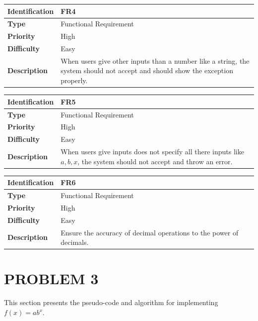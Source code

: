 \documentclass[11pt]{article}
\begin{document}
\begin{center}
    \begin{tabular}{|p{3cm}|p{11cm}| }
    \hline
    \textbf{Identification} &  FR4 \\ \hline 
    \textbf{Type} & Functional Requirement\\ \hline 
    \textbf{Priority} & High  \\ \hline
    \textbf{Difficulty} & Easy  \\ \hline
    \textbf{Description} & When users give other inputs than a number like a string, the system should not accept and should show the exception properly.\\ \hline
\end{tabular}
\end{center}

\begin{center}
    \begin{tabular}{|p{3cm}|p{11cm}| }
    \hline
    \textbf{Identification} &  FR5 \\ \hline 
    \textbf{Type} & Functional Requirement\\ \hline 
    \textbf{Priority} & High  \\ \hline
    \textbf{Difficulty} & Easy  \\ \hline
    \textbf{Description} & When users give inputs does not specify all there inputs like $a, b, x$, the system should not accept and throw an error.\\ \hline
\end{tabular}
\end{center}

\begin{center}
    \begin{tabular}{|p{3cm}|p{11cm}| }
    \hline
    \textbf{Identification} &  FR6 \\ \hline 
    \textbf{Type} & Functional Requirement\\ \hline 
    \textbf{Priority} & High  \\ \hline
    \textbf{Difficulty} & Easy  \\ \hline
    \textbf{Description} &Ensure the accuracy of decimal operations to the power of decimals.\\ \hline
\end{tabular}
\end{center}

\section{PROBLEM 3}\label{problem3}
This section presents the pseudo-code and algorithm for implementing $f(x)=ab^x$.
\end{document}
